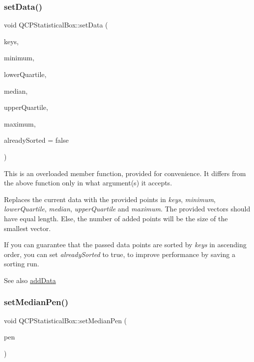 \subsubsection{\texorpdfstring{setData()}{setData()}\hspace{0.1cm}{\footnotesize\ttfamily [2/2]}}
{\footnotesize\ttfamily void Q\+C\+P\+Statistical\+Box\+::set\+Data (\begin{DoxyParamCaption}\item[{const Q\+Vector$<$ double $>$ \&}]{keys,  }\item[{const Q\+Vector$<$ double $>$ \&}]{minimum,  }\item[{const Q\+Vector$<$ double $>$ \&}]{lower\+Quartile,  }\item[{const Q\+Vector$<$ double $>$ \&}]{median,  }\item[{const Q\+Vector$<$ double $>$ \&}]{upper\+Quartile,  }\item[{const Q\+Vector$<$ double $>$ \&}]{maximum,  }\item[{bool}]{already\+Sorted = {\ttfamily false} }\end{DoxyParamCaption})}

This is an overloaded member function, provided for convenience. It differs from the above function only in what argument(s) it accepts.

Replaces the current data with the provided points in {\itshape keys}, {\itshape minimum}, {\itshape lower\+Quartile}, {\itshape median}, {\itshape upper\+Quartile} and {\itshape maximum}. The provided vectors should have equal length. Else, the number of added points will be the size of the smallest vector.

If you can guarantee that the passed data points are sorted by {\itshape keys} in ascending order, you can set {\itshape already\+Sorted} to true, to improve performance by saving a sorting run.

\begin{DoxySeeAlso}{See also}
\mbox{\hyperlink{class_q_c_p_statistical_box_a9a8739c5b8291db8fd839e892fc8f478}{add\+Data}} 
\end{DoxySeeAlso}
\mbox{\label{class_q_c_p_statistical_box_a7260ac55b669f5d0a74f16d5ca84c52c}} 
\subsubsection{\texorpdfstring{setMedianPen()}{setMedianPen()}}
{\footnotesize\ttfamily void Q\+C\+P\+Statistical\+Box\+::set\+Median\+Pen (\begin{DoxyParamCaption}\item[{const Q\+Pen \&}]{pen }\end{DoxyParamCaption})}


